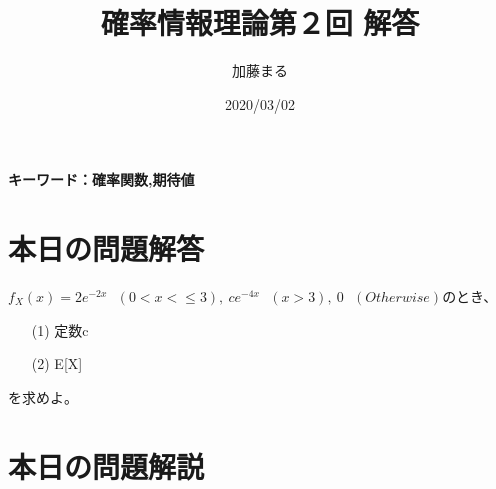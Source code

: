 \documentclass[a4j,uplatex]{jsarticle}
\title{確率情報理論第２回 解答}
\author{加藤まる}
\date{2020/03/02}
\begin{document}
\maketitle
\bf キーワード：確率関数,期待値
\rm

\section*{本日の問題解答}
$f_X(x)=2e^{-2x}~~~(0<x<\le 3),~ce^{-4x}~~~(x>3),~0~~~(Otherwise)$のとき、
\begin{itemize}
  \item[(1)] 定数c
  \item[(2)] E[X]  
\end{itemize}
を求めよ。


\section*{本日の問題解説}
\end{document}
